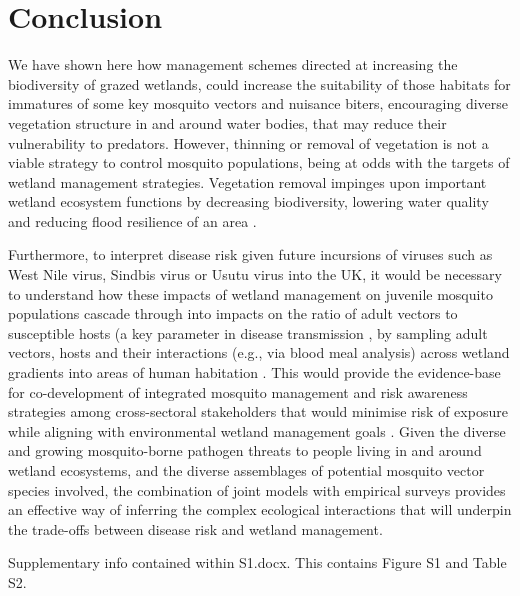 \documentclass[lineno,sn-basic]{sn-jnl}%
\begin{document}
\section{Conclusion}

We have shown here how management schemes directed at increasing the biodiversity of grazed wetlands, could increase the suitability of those habitats for immatures of some key mosquito vectors and nuisance biters, encouraging diverse vegetation structure in and around water bodies, that may reduce their vulnerability to predators. However, thinning or removal of vegetation is not a viable strategy to control mosquito populations, being at odds with the targets of wetland management strategies. Vegetation removal impinges upon important wetland ecosystem functions by decreasing biodiversity, lowering water quality and reducing flood resilience of an area \citep{acremanTradeoffEcosystemServices2011, rochlinEffectsIntegratedMarsh2012}.

Furthermore, to interpret disease risk given future incursions of viruses such as West Nile virus, Sindbis virus or Usutu virus into the UK, it would be necessary to understand how these impacts of wetland management on juvenile mosquito populations cascade through into impacts on the ratio of adult vectors to susceptible hosts (a key parameter in disease transmission \citep{smithRiskMosquitoBorneInfectionin2004a}, by sampling adult vectors, hosts and their interactions (e.g., via blood meal analysis) across wetland gradients into areas of human habitation \citep{hanfordManagementUrbanWetlands2020}. This would provide the evidence-base for co-development of integrated mosquito management and risk awareness strategies among cross-sectoral stakeholders that would minimise risk of exposure while aligning with environmental wetland management goals \citep{martinouCallArmsSetting2020}. Given the diverse and growing mosquito-borne pathogen threats to people living in and around wetland ecosystems, and the diverse assemblages of potential mosquito vector species involved, the combination of joint models with empirical surveys provides an effective way of inferring the complex ecological interactions that will underpin the trade-offs between disease risk and wetland management.

\backmatter


Supplementary info contained within S1.docx. This contains Figure S1 and Table S2.

\end{document}

